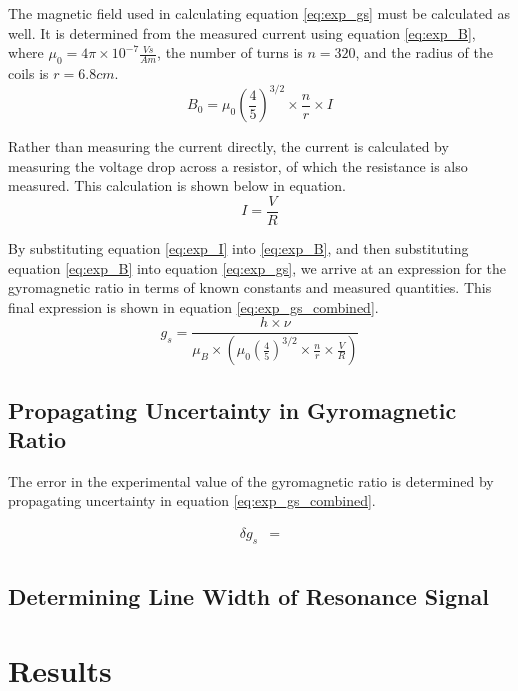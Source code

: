 \documentclass[a4paper]{article}
\begin{document}
\qq The magnetic field used in calculating equation \ref{eq:exp_gs} must be calculated as well. It is determined from the measured current using equation \ref{eq:exp_B}, where $\mu_0 = 4 \pi \times 10^{-7} \frac{Vs}{Am}$, the number of turns is $n=320$, and the radius of the coils is $r=6.8cm$.
\begin{equation}
\label{eq:exp_B}
B_0 = \mu_0 \left( \frac{4}{5} \right) ^{3/2} \times \frac{n}{r} \times I
\end{equation}

\qq Rather than measuring the current directly, the current is calculated by measuring the voltage drop across a resistor, of which the resistance is also measured. This calculation is shown below in equation.
\begin{equation}
\label{eq:exp_I}
I = \frac{V}{R}
\end{equation}

\qq By substituting equation \ref{eq:exp_I} into \ref{eq:exp_B}, and then substituting equation \ref{eq:exp_B} into equation \ref{eq:exp_gs}, we arrive at an expression for the gyromagnetic ratio in terms of known constants and measured quantities. This final expression is shown in equation \ref{eq:exp_gs_combined}.
\begin{equation}
\label{eq:exp_gs_combined}
g_s = \frac{h \times \nu}{\mu_B \times \left( \mu_0 \left( \frac{4}{5} \right) ^{3/2} \times \frac{n}{r} \times \frac{V}{R} \right) }
\end{equation}

\subsection{Propagating Uncertainty in Gyromagnetic Ratio}
\qq The error in the experimental value of the gyromagnetic ratio is determined by propagating uncertainty in equation \ref{eq:exp_gs_combined}.

\begin{align*}
\delta g_s &= \\
\end{align*}

\subsection{Determining Line Width of Resonance Signal}
\qq 

\section{Results}
\qq
\end{document}
